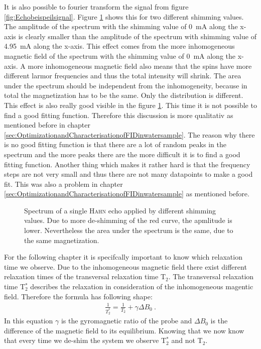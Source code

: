 It is also possible to fourier transform the signal from figure \ref{fig:Echobeispeilsignal}. Figure \ref{fig:SpinEcho} shows this for two different shimming values. The amplitude of the spectrum with the shimming value of \SI{0}{\milli \ampere} along the x-axis is clearly smaller than the amplitude of the spectrum with shimming value of \SI{4.95}{\milli \ampere} along the x-axis. This effect comes from the more inhomogeneous magnetic field of the spectrum with the shimming value of \SI{0}{\milli \ampere} along the x-axis. A more inhomogeneous magnetic field also means that the spins have more different larmor frequencies and thus the total intensity will shrink. The area under the spectrum should be independent from the inhomogeneity, because in total the magnetization has to be the same. Only the distribution is different. This effect is also really good visible in the figure \ref{fig:SpinEcho}. This time it is not possible to find a good fitting function. Therefore this discussion is more qualitativ as mentioned before in chapter \ref{sec:OptimizationandCharacterisationofFIDinwatersample}. The reason why there is no good fitting function is that there are a lot of random peaks in the spectrum and the more peaks there are the more difficult it is to find a good fitting function. Another thing which makes it rather hard is that the frequency steps are not very small and thus there are not many datapoints to make a good fit. This was also a problem in chapter \ref{sec:OptimizationandCharacterisationofFIDinwatersample} as mentioned before.
\begin{figure}[H]
    \centering
    
    \caption[Spectrum of a single \textsc{Hahn} echo applied by different shimming values.]{Spectrum of a single \textsc{Hahn} echo applied by different shimming values. Due to more de-shimming of the red curve, the apmlitude is lower. Nevertheless the area under the spectrum is the same, due to the same magnetization.}
    \label{fig:SpinEcho}
\end{figure}
For the following chapter it is specifcally important to know which relaxation time we observe. Due to the inhomogeneous magnetic field there exist different relaxation times of the transversal relaxation time T$_2$. The transversal relaxation time T$_2^*$ describes the relaxation in consideration of the inhomogeneous magentic field. Therefore the formula has following shape:
\begin{align}
    \frac{1}{T_2^*} = \frac{1}{T_2} + \gamma \Delta B_0 \ .
    \label{eq:T2_star}
\end{align}
In this equation $\gamma$ is the gyromagnetic ratio of the probe and $\Delta B_0$ is the difference of the magnetic field to its equilibrium. Knowing that we now know that every time we de-shim the system we observe T$_2^*$ and not T$_2$.
